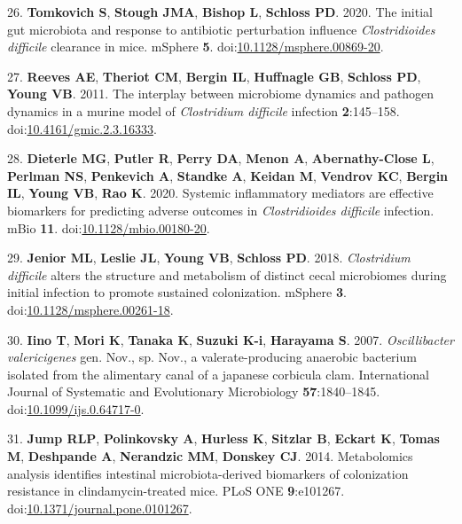 \documentclass[
  11pt,
]{article}
\begin{document}
\leavevmode\hypertarget{ref-Tomkovich2020}{}%
26. \textbf{Tomkovich S}, \textbf{Stough JMA}, \textbf{Bishop L},
\textbf{Schloss PD}. 2020. The initial gut microbiota and response to
antibiotic perturbation influence \emph{Clostridioides difficile}
clearance in mice. mSphere \textbf{5}.
doi:\href{https://doi.org/10.1128/msphere.00869-20}{10.1128/msphere.00869-20}.

\leavevmode\hypertarget{ref-Reeves2011}{}%
27. \textbf{Reeves AE}, \textbf{Theriot CM}, \textbf{Bergin IL},
\textbf{Huffnagle GB}, \textbf{Schloss PD}, \textbf{Young VB}. 2011. The
interplay between microbiome dynamics and pathogen dynamics in a murine
model of \emph{Clostridium difficile} infection \textbf{2}:145--158.
doi:\href{https://doi.org/10.4161/gmic.2.3.16333}{10.4161/gmic.2.3.16333}.

\leavevmode\hypertarget{ref-Dieterle2020}{}%
28. \textbf{Dieterle MG}, \textbf{Putler R}, \textbf{Perry DA},
\textbf{Menon A}, \textbf{Abernathy-Close L}, \textbf{Perlman NS},
\textbf{Penkevich A}, \textbf{Standke A}, \textbf{Keidan M},
\textbf{Vendrov KC}, \textbf{Bergin IL}, \textbf{Young VB}, \textbf{Rao
K}. 2020. Systemic inflammatory mediators are effective biomarkers for
predicting adverse outcomes in \emph{Clostridioides difficile}
infection. mBio \textbf{11}.
doi:\href{https://doi.org/10.1128/mbio.00180-20}{10.1128/mbio.00180-20}.

\leavevmode\hypertarget{ref-Jenior2018}{}%
29. \textbf{Jenior ML}, \textbf{Leslie JL}, \textbf{Young VB},
\textbf{Schloss PD}. 2018. \emph{Clostridium difficile} alters the
structure and metabolism of distinct cecal microbiomes during initial
infection to promote sustained colonization. mSphere \textbf{3}.
doi:\href{https://doi.org/10.1128/msphere.00261-18}{10.1128/msphere.00261-18}.

\leavevmode\hypertarget{ref-Iino2007}{}%
30. \textbf{Iino T}, \textbf{Mori K}, \textbf{Tanaka K}, \textbf{Suzuki
K-i}, \textbf{Harayama S}. 2007. \emph{Oscillibacter valericigenes} gen.
Nov., sp. Nov., a valerate-producing anaerobic bacterium isolated from
the alimentary canal of a japanese corbicula clam. International Journal
of Systematic and Evolutionary Microbiology \textbf{57}:1840--1845.
doi:\href{https://doi.org/10.1099/ijs.0.64717-0}{10.1099/ijs.0.64717-0}.

\leavevmode\hypertarget{ref-Jump2014}{}%
31. \textbf{Jump RLP}, \textbf{Polinkovsky A}, \textbf{Hurless K},
\textbf{Sitzlar B}, \textbf{Eckart K}, \textbf{Tomas M},
\textbf{Deshpande A}, \textbf{Nerandzic MM}, \textbf{Donskey CJ}. 2014.
Metabolomics analysis identifies intestinal microbiota-derived
biomarkers of colonization resistance in clindamycin-treated mice. PLoS
ONE \textbf{9}:e101267.
doi:\href{https://doi.org/10.1371/journal.pone.0101267}{10.1371/journal.pone.0101267}.
\end{document}
